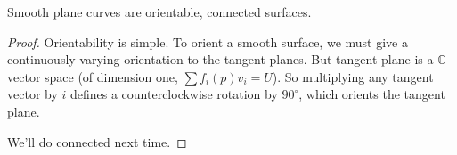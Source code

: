 \documentclass [letterpaper,11pt,twoside]{article}
\begin{document}
    \begin{cor*}
      Smooth plane curves are orientable, connected surfaces.
    \end{cor*}
    \begin{proof}
      Orientability is simple.  To orient a smooth surface, we must give a continuously varying orientation to the tangent planes.  But tangent plane is a $\mathbb C$-vector space (of dimension one, $\sum f_i(p) v_i = U$).  So multiplying any tangent vector by $i$ defines a counterclockwise rotation by $90^\circ$, which orients the tangent plane.

      We'll do connected next time.
    \end{proof}
\end{document}
